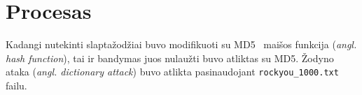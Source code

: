 \section{Procesas}
\label{sec:Procesas}

Kadangi nutekinti slaptažodžiai buvo modifikuoti su MD5~\cite{MD5} maišos funkcija (\textit{angl. hash function}), tai ir bandymas juos nulaužti buvo atliktas su MD5. Žodyno ataka (\textit{angl. dictionary attack}) buvo atlikta pasinaudojant \texttt{rockyou\_1000.txt}~\cite{VMA} failu.